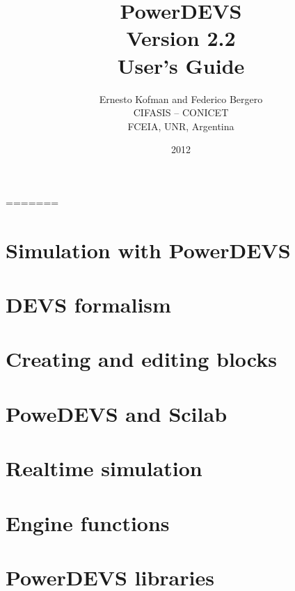 \documentclass[a4paper,12pt]{book}
\title{\Huge{\textbf{PowerDEVS}}\\ \vspace{1cm} \large{Version 2.2} \\ \vspace{1cm} \huge{User's Guide}\vspace{2cm}}
\author{ Ernesto Kofman and Federico Bergero\vspace{2cm} \\ CIFASIS -- CONICET\\FCEIA, UNR, Argentina}
\date{2012}
\begin{document}
 \maketitle

 \tableofcontents





%


=======



\chapter{Simulation with PowerDEVS}

\chapter{DEVS formalism}

\chapter{Creating and editing blocks}

\chapter{PoweDEVS and Scilab}

\chapter{Realtime simulation}

\appendix
\chapter{Engine functions}

\chapter{PowerDEVS libraries}
\end{document}
